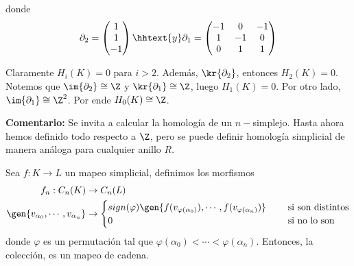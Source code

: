 \documentclass{article}
\begin{document}
\begin{enumerate}
    \vspace{2mm}
    \centerline{
    }
    \vspace{2mm}
    donde
    \begin{equation*}
        \partial_{2}=\begin{pmatrix}
            1 \\ 1 \\ -1
        \end{pmatrix}
        \hhtext{y}
        \partial_{1}=\begin{pmatrix}
            -1 & 0 & -1 \\ 1 & -1 & 0 \\ 0 & 1 & 1
        \end{pmatrix}
    \end{equation*}

    Claramente $H_{i}(K)=0$ para $i>2$. Además, $\kr{\partial_{2}}$, entonces $H_{2}(K)=0$. 
    Notemos que $\im{\partial_{2}}\cong\Z$ y $\kr{\partial_{1}}\cong\Z$, luego $H_{1}(K)=0$. Por
    otro lado, $\im{\partial_{1}}\cong\Z^{2}$. Por ende $H_{0}(K)\cong\Z$.
\end{enumerate}

\vspace{2mm}
\noindent\textbf{Comentario:} Se invita a calcular la homología de un $n-$simplejo. Hasta ahora 
hemos definido todo respecto a $\Z$, pero se puede definir homología simplicial de manera análoga 
para cualquier anillo $R$.

\vspace{2mm}
\begin{lema}
    Sea $f:K\to L$ un mapeo simplicial, definimos los morfismos
    \begin{align*}
        f_{n}:C_{n}(K) &\to C_{n}(L) \\
        \gen{v_{\alpha_{0}},\cdots,v_{\alpha_{n}}} &\to \begin{cases}
            sign(\varphi)\gen{f(v_{\varphi(\alpha_{0})}),\cdots,f(v_{\varphi(\alpha_{n})})} 
            &\quad\text{ si son distintos} \\
            0 &\quad\text{ si no lo son}
        \end{cases}
    \end{align*}
    donde $\varphi$ es un permutación tal que $\varphi(\alpha_{0})<\cdots<\varphi(\alpha_{n})$. 
    Entonces, la colección, es un mapeo de cadena.
\end{lema}
\end{document}
